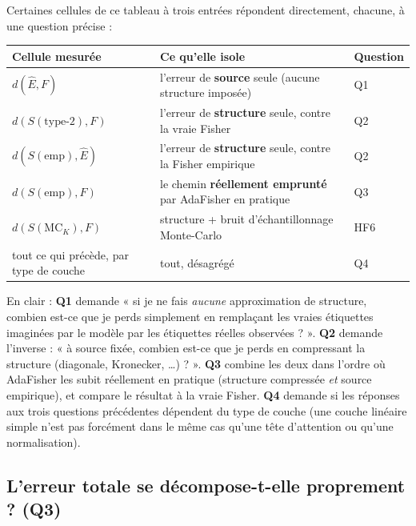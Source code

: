 \documentclass[11pt,a4paper]{article}
\begin{document}
Certaines cellules de ce tableau à trois entrées répondent directement, chacune, à une question
précise :

\begin{center}
\begin{tabular}{@{}p{4.6cm}p{5.2cm}p{2.6cm}@{}}
\toprule
Cellule mesurée & Ce qu'elle isole & Question \\
\midrule
$d(\hat E, F)$ & l'erreur de \textbf{source} seule (aucune structure imposée) & Q1 \\
$d(S(\text{type-2}), F)$ & l'erreur de \textbf{structure} seule, contre la vraie Fisher & Q2 \\
$d(S(\text{emp}), \hat E)$ & l'erreur de \textbf{structure} seule, contre la Fisher empirique & Q2 \\
$d(S(\text{emp}), F)$ & le chemin \textbf{réellement emprunté} par AdaFisher en pratique & Q3 \\
$d(S(\mathrm{MC}_K), F)$ & structure + bruit d'échantillonnage Monte-Carlo & HF6 \\
tout ce qui précède, par type de couche & tout, désagrégé & Q4 \\
\bottomrule
\end{tabular}
\end{center}

En clair : \textbf{Q1} demande « si je ne fais \emph{aucune} approximation de structure, combien
est-ce que je perds simplement en remplaçant les vraies étiquettes imaginées par le modèle par les
étiquettes réelles observées ? ». \textbf{Q2} demande l'inverse : « à source fixée, combien
est-ce que je perds en compressant la structure (diagonale, Kronecker, \dots) ? ». \textbf{Q3}
combine les deux dans l'ordre où AdaFisher les subit réellement en pratique (structure compressée
\emph{et} source empirique), et compare le résultat à la vraie Fisher. \textbf{Q4} demande si les
réponses aux trois questions précédentes dépendent du type de couche (une couche linéaire simple
n'est pas forcément dans le même cas qu'une tête d'attention ou qu'une normalisation).

\subsection{L'erreur totale se décompose-t-elle proprement ? (Q3)}
\end{document}
